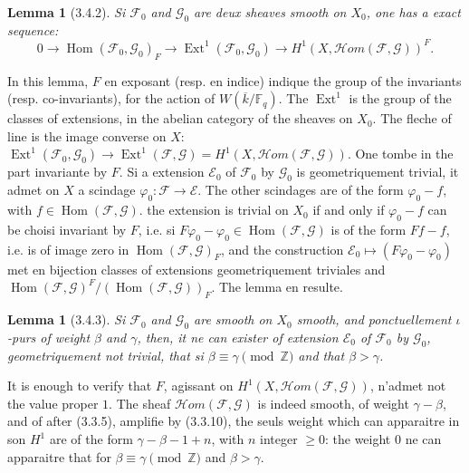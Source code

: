 \documentclass[12pt,a4paper]{article}
\theoremstyle{plain}
\newtheorem{lemma}[theorem]{Lemma}
\theoremstyle{definition}
\theoremstyle{remark}
\DeclareMathOperator{\Ext}{Ext}
\DeclareMathOperator{\Hom}{Hom}
\newcommand{\FF}{{\mathbb{F}}}
\newcommand{\ZZ}{{\mathbb{Z}}}
\begin{document}
\begin{lemma}[3.4.2]
Si $\mathscr{F}_0$ and $\mathscr{G}_0$ are deux sheaves smooth on $X_0$, one has a exact sequence:
\[ 0 \to \Hom(\mathscr{F}_0, \mathscr{G}_0)_F \to \Ext^1(\mathscr{F}_0, \mathscr{G}_0) \to H^1(X, \mathscr{H}om(\mathscr{F}, \mathscr{G}))^F. \]
\end{lemma}

In this lemma, $F$ en exposant (resp. en indice) indique the group of the invariants (resp. co-invariants), for the action of $W(\overline{k}/\FF_q)$. The $\Ext^1$ is the group of the classes of extensions, in the abelian category of the sheaves on $X_0$. The fleche of line is the image converse on $X$: $\Ext^1(\mathscr{F}_0, \mathscr{G}_0) \to \Ext^1(\mathscr{F}, \mathscr{G}) = H^1(X, \mathscr{H}om(\mathscr{F}, \mathscr{G}))$. One tombe in the part invariante by $F$. Si a extension $\mathscr{E}_0$ of $\mathscr{F}_0$ by $\mathscr{G}_0$ is geometriquement trivial, it admet on $X$ a scindage $\varphi_0 : \mathscr{F} \to \mathscr{E}$. The other scindages are of the form $\varphi_0 - f$, with $f \in \Hom(\mathscr{F}, \mathscr{G})$. the extension is trivial on $X_0$ if and only if $\varphi_0 - f$ can be choisi invariant by $F$, i.e. si $F\varphi_0 - \varphi_0 \in \Hom(\mathscr{F}, \mathscr{G})$ is of the form $Ff - f$, i.e. is of image zero in $\Hom(\mathscr{F}, \mathscr{G})_F$, and the construction $\mathscr{E}_0 \mapsto (F\varphi_0 - \varphi_0)$ met en bijection classes of extensions geometriquement triviales and $\Hom(\mathscr{F}, \mathscr{G})^F / (\Hom(\mathscr{F}, \mathscr{G}))_F$. The lemma en resulte.

\begin{lemma}[3.4.3]
Si $\mathscr{F}_0$ and $\mathscr{G}_0$ are smooth on $X_0$ smooth, and ponctuellement $\iota$-purs of weight $\beta$ and $\gamma$, then, it ne can exister of extension $\mathscr{E}_0$ of $\mathscr{F}_0$ by $\mathscr{G}_0$, geometriquement not trivial, that si $\beta \equiv \gamma \pmod{\ZZ}$ and that $\beta > \gamma$.
\end{lemma}

It is enough to verify that $F$, agissant on $H^1(X, \mathscr{H}om(\mathscr{F}, \mathscr{G}))$, n'admet not the value proper $1$. The sheaf $\mathscr{H}om(\mathscr{F}, \mathscr{G})$ is indeed smooth, of weight $\gamma - \beta$, and of after (3.3.5), amplifie by (3.3.10), the seuls weight which can apparaitre in son $H^1$ are of the form $\gamma - \beta - 1 + n$, with $n$ integer $\geq 0$: the weight $0$ ne can apparaitre that for $\beta \equiv \gamma \pmod{\ZZ}$ and $\beta > \gamma$.
\end{document}
